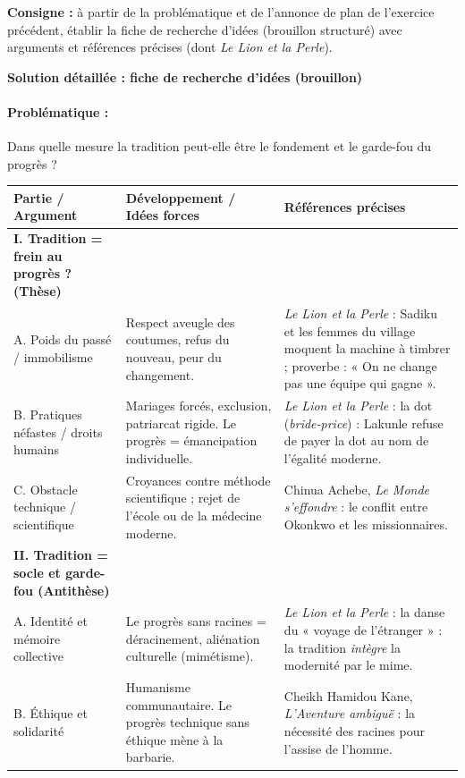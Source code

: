 \documentclass[11pt]{article}
\begin{document}
\begin{exoresolu}
\textbf{Consigne :} à partir de la problématique et de l'annonce de plan de l'exercice précédent, établir la fiche de recherche d'idées (brouillon structuré) avec arguments et références précises (dont \emph{Le Lion et la Perle}).

\tcblower
\textbf{Solution détaillée : fiche de recherche d'idées (brouillon)}

\paragraph{Problématique :} Dans quelle mesure la tradition peut-elle être le fondement et le garde-fou du progrès ?

\begin{center}
\begin{tabularx}{\linewidth}{|l|X|X|}\hline
\rowcolor{popblueL}\textbf{Partie / Argument} & \textbf{Développement / Idées forces} & \textbf{Références précises} \\ \hline
\textbf{I. Tradition = frein au progrès ? (Thèse)} & & \\ \hline
A. Poids du passé / immobilisme & Respect aveugle des coutumes, refus du nouveau, peur du changement. & \emph{Le Lion et la Perle} : Sadiku et les femmes du village moquent la machine à timbrer ; proverbe : « On ne change pas une équipe qui gagne ». \\ \hline
B. Pratiques néfastes / droits humains & Mariages forcés, exclusion, patriarcat rigide. Le progrès = émancipation individuelle. & \emph{Le Lion et la Perle} : la dot (\emph{bride-price}) : Lakunle refuse de payer la dot au nom de l'égalité moderne. \\ \hline
C. Obstacle technique / scientifique & Croyances contre méthode scientifique ; rejet de l'école ou de la médecine moderne. & Chinua Achebe, \emph{Le Monde s'effondre} : le conflit entre Okonkwo et les missionnaires. \\ \hline
\textbf{II. Tradition = socle et garde-fou (Antithèse)} & & \\ \hline
A. Identité et mémoire collective & Le progrès sans racines = déracinement, aliénation culturelle (mimétisme). & \emph{Le Lion et la Perle} : la danse du « voyage de l'étranger » : la tradition \emph{intègre} la modernité par le mime. \\ \hline
B. Éthique et solidarité & Humanisme communautaire. Le progrès technique sans éthique mène à la barbarie. & Cheikh Hamidou Kane, \emph{L'Aventure ambiguë} : la nécessité des racines pour l'assise de l'homme. \\ \hline

\end{tabularx}
\end{center}
\end{exoresolu}
\end{document}
